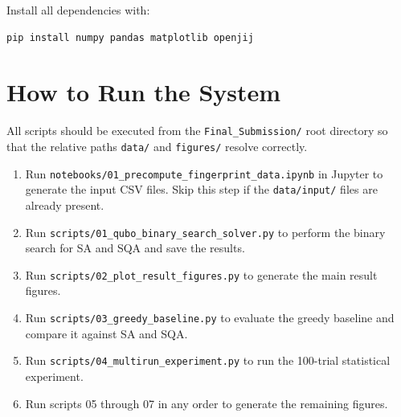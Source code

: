 \documentclass[12pt,a4paper]{article}
\begin{document}
Install all dependencies with:

\begin{verbatim}
pip install numpy pandas matplotlib openjij
\end{verbatim}

\section{How to Run the System}

All scripts should be executed from the \texttt{Final\_Submission/} root
directory so that the relative paths \texttt{data/} and \texttt{figures/}
resolve correctly.

\begin{enumerate}[leftmargin=2em]
    \item Run \texttt{notebooks/01\_precompute\_fingerprint\_data.ipynb} in
          Jupyter to generate the input CSV files. Skip this step if the
          \texttt{data/input/} files are already present.
    \item Run \texttt{scripts/01\_qubo\_binary\_search\_solver.py} to perform
          the binary search for SA and SQA and save the results.
    \item Run \texttt{scripts/02\_plot\_result\_figures.py} to generate the
          main result figures.
    \item Run \texttt{scripts/03\_greedy\_baseline.py} to evaluate the greedy
          baseline and compare it against SA and SQA.
    \item Run \texttt{scripts/04\_multirun\_experiment.py} to run the 100-trial
          statistical experiment.
    \item Run scripts 05 through 07 in any order to generate the remaining
          figures.
\end{enumerate}
\end{document}
